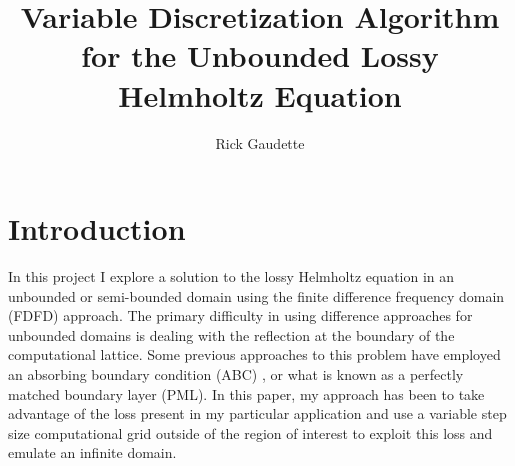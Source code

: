 \documentclass [11 pt, titlepage]{article}
\title {Variable Discretization Algorithm for the Unbounded Lossy Helmholtz Equation}
\author {Rick Gaudette}
\begin{document}
\maketitle



\section {Introduction}
\vspace {-4ex}
In this project I explore a solution to the lossy Helmholtz equation
in an unbounded or semi-bounded domain using the finite difference
frequency domain (FDFD) approach.  The primary difficulty in using
difference approaches for unbounded domains is dealing with the
reflection at the boundary of the computational lattice.  Some
previous approaches to this problem have employed an absorbing
boundary condition (ABC) \cite{Engquist:77}\cite{Bayliss:82}, or what is known as a
perfectly matched boundary layer (PML)\cite{Berenger:94}.  In this paper, my
approach has been to take advantage of the loss present in my
particular application and use a variable step size computational grid
outside of the region of interest to exploit this loss and emulate an
infinite domain.
\end{document}
